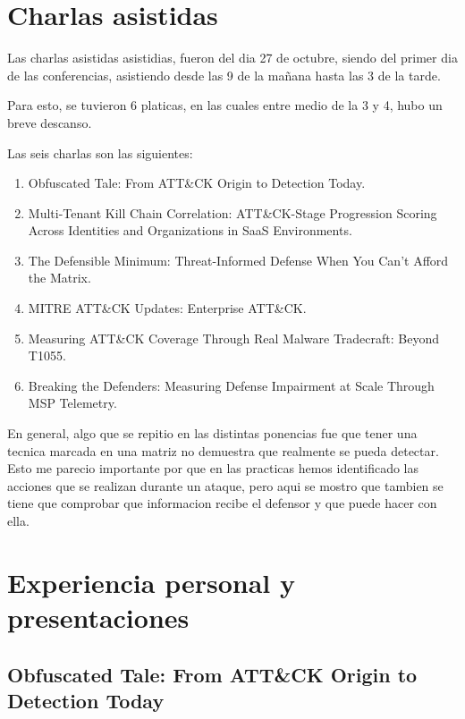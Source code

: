 \documentclass[letterpaper,12pt]{article}
\begin{document}
\setlength{\emergencystretch}{1em}
\hypersetup{pageanchor=false}

\newpage
{\hypersetup{linkcolor=black}\tableofcontents}
\thispagestyle{estiloindice}
\newpage
\thispagestyle{fancy}
\setcounter{page}{1}
\hypersetup{pageanchor=true}
\singlespacing

\section{Charlas asistidas}

Las charlas asistidas asistidias, fueron del dia 27 de octubre, siendo del primer dia 
de las conferencias, asistiendo desde las 9 de la mañana hasta las 3 de la tarde.

Para esto, se tuvieron 6 platicas, en las cuales entre medio de la 3 y 4, hubo un breve
descanso.

Las seis charlas son las siguientes: 

\begin{enumerate}
    \item Obfuscated Tale: From ATT\&CK Origin to Detection Today.
    \item Multi-Tenant Kill Chain Correlation: ATT\&CK-Stage Progression Scoring Across Identities and Organizations in SaaS Environments.
    \item The Defensible Minimum: Threat-Informed Defense When You Can't Afford the Matrix.
    \item MITRE ATT\&CK Updates: Enterprise ATT\&CK.
    \item Measuring ATT\&CK Coverage Through Real Malware Tradecraft: Beyond T1055.
    \item Breaking the Defenders: Measuring Defense Impairment at Scale Through MSP Telemetry.
\end{enumerate}

En general, algo que se repitio en las distintas ponencias fue
que tener una tecnica marcada en una matriz no demuestra que
realmente se pueda detectar. Esto me parecio importante por que
en las practicas hemos identificado las acciones que se realizan
durante un ataque, pero aqui se mostro que tambien se tiene que
comprobar que informacion recibe el defensor y que puede hacer
con ella.

\section{Experiencia personal y presentaciones}

\subsection{Obfuscated Tale: From ATT\&CK Origin to Detection Today}
\end{document}
